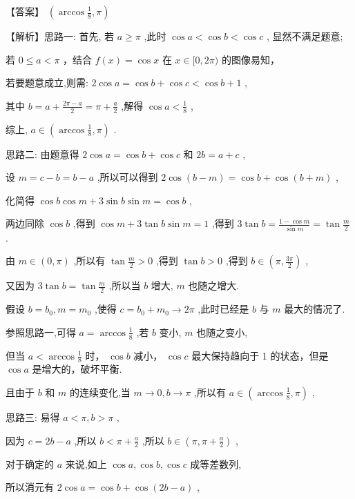 \documentclass[10pt]{article}
\newcommand*\circled[1]{\tikz[baseline=(char.base)]{\node[shape=circle,draw,inner sep=1.5pt] (char) {\small #1};}}
\begin{document}
【答案】 \(\left( {\arccos \frac{1}{8},\pi }\right)\)

【解析】思路一: 首先, \circled{1}  若 \(a \geq  \pi\) ,此时 \(\cos a < \cos b < \cos c\) , 显然不满足题意;

 \circled{2}  若 \(0 \leq  a < \pi\) ，结合 \(f\left( x\right)  = \cos x\) 在 \(x \in  \lbrack 0,{2\pi })\) 的图像易知，

若要题意成立,则需: \(2\cos a = \cos b + \cos c < \cos b + 1\) ,

其中 \(b = a + \frac{{2\pi } - a}{2} = \pi  + \frac{a}{2}\) ,解得 \(\cos a < \frac{1}{8}\) ,

综上, \(a \in  \left( {\arccos \frac{1}{8},\pi }\right)\) .

思路二: 由题意得 \(2\cos a = \cos b + \cos c\) 和 \({2b} = a + c\) ,

设 \(m = c - b = b - a\) ,所以可以得到 \(2\cos \left( {b - m}\right)  = \cos b + \cos \left( {b + m}\right)\) ,

化简得 \(\cos b\cos m + 3\sin b\sin m = \cos b\) ,

两边同除 \(\cos b\) ,得到 \(\cos m + 3\tan b\sin m = 1\) ,得到 \(3\tan b = \frac{1 - \cos m}{\sin m} = \tan \frac{m}{2}\) .

由 \(m \in  \left( {0,\pi }\right)\) ,所以有 \(\tan \frac{m}{2} > 0\) ,得到 \(\tan b > 0\) ,得到 \(b \in  \left( {\pi ,\frac{3\pi }{2}}\right)\) ,

又因为 \(3\tan b = \tan \frac{m}{2}\) ,所以当 \(b\) 增大, \(m\) 也随之增大.

假设 \(b = {b}_{0},m = {m}_{0}\) ,使得 \(c = {b}_{0} + {m}_{0} \rightarrow  {2\pi }\) ,此时已经是 \(b\) 与 \(m\) 最大的情况了.

参照思路一,可得 \(a = \arccos \frac{1}{8}\) ,若 \(b\) 变小, \(m\) 也随之变小,

但当 \(a < \arccos \frac{1}{8}\) 时， \(\cos b\) 减小， \(\cos c\) 最大保持趋向于 1 的状态，但是 \(\cos a\) 是增大的，破坏平衡.

且由于 \(b\) 和 \(m\) 的连续变化,当 \(m \rightarrow  0,b \rightarrow  \pi\) ,所以有 \(a \in  \left( {\arccos \frac{1}{8},\pi }\right)\) ,

思路三: 易得 \(a < \pi ,b > \pi\) ,

因为 \(c = {2b} - a\) ,所以 \(b < \pi  + \frac{a}{2}\) ,所以 \(b \in  \left( {\pi ,\pi  + \frac{a}{2}}\right)\) ,

对于确定的 \(a\) 来说,如上 \(\cos a,\cos b,\cos c\) 成等差数列,

所以消元有 \(2\cos a = \cos b + \cos \left( {{2b} - a}\right)\) ,
\end{document}
